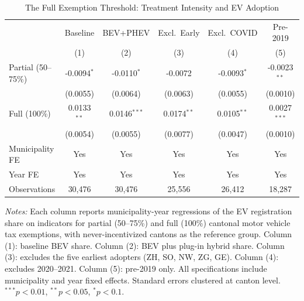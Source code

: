 \begin{table}[htbp]
\centering
\caption{The Full Exemption Threshold: Treatment Intensity and EV Adoption}
\label{tab:intensity}
\small
\begin{tabular}{lccccc}
\toprule
 & Baseline & BEV+PHEV & Excl.\ Early & Excl.\ COVID & Pre-2019 \\
 & (1) & (2) & (3) & (4) & (5) \\
\midrule
Partial (50--75\%) & -0.0094$^{*}$ & -0.0110$^{*}$ & -0.0072 & -0.0093$^{*}$ & -0.0023$^{**}$ \\
 & (0.0055) & (0.0064) & (0.0063) & (0.0055) & (0.0010) \\
Full (100\%) & 0.0133$^{**}$ & 0.0146$^{***}$ & 0.0174$^{**}$ & 0.0105$^{**}$ & 0.0027$^{***}$ \\
 & (0.0054) & (0.0055) & (0.0077) & (0.0047) & (0.0010) \\
\midrule
Municipality FE & Yes & Yes & Yes & Yes & Yes \\
Year FE & Yes & Yes & Yes & Yes & Yes \\
Observations & 30,476 & 30,476 & 25,556 & 26,412 & 18,287 \\
\bottomrule
\end{tabular}
\begin{tablenotes}
\item \textit{Notes:} Each column reports municipality-year regressions of the EV registration share on indicators for partial (50--75\%) and full (100\%) cantonal motor vehicle tax exemptions, with never-incentivized cantons as the reference group. Column (1): baseline BEV share. Column (2): BEV plus plug-in hybrid share. Column (3): excludes the five earliest adopters (ZH, SO, NW, ZG, GE). Column (4): excludes 2020--2021. Column (5): pre-2019 only. All specifications include municipality and year fixed effects. Standard errors clustered at canton level. $^{***}p<0.01$, $^{**}p<0.05$, $^{*}p<0.1$.
\end{tablenotes}
\end{table}
